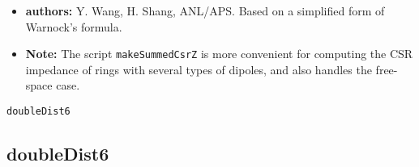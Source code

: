 \documentclass[11pt]{article}
\begin{document}
\begin{itemize}
\item {\bf authors:} Y. Wang, H. Shang, ANL/APS.
Based on a simplified form\cite{Agoh} of Warnock's \cite{Warnock} formula.

\item {\bf Note:} The script \verb|makeSummedCsrZ| is more convenient for computing the CSR impedance of
  rings with several types of dipoles, and also handles the free-space case.

\end{itemize}

\newpage
\begin{center}{\Large\verb|doubleDist6|}\end{center}
\subsection{doubleDist6}
\end{document}
